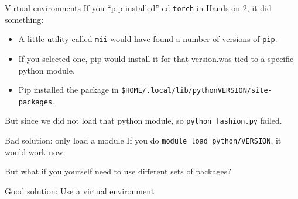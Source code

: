 \documentclass[
  10pt,
  ignorenonframetext,
  aspectratio=169,handout]{beamer}
\newenvironment{Shaded}{\begin{snugshade}}{\end{snugshade}}
\newcommand{\AttributeTok}[1]{\textcolor[rgb]{0.80,0.80,0.80}{#1}}
\newcommand{\ExtensionTok}[1]{\textcolor[rgb]{0.80,0.80,0.80}{#1}}
\newcommand{\KeywordTok}[1]{\textcolor[rgb]{0.94,0.87,0.69}{#1}}
\newcommand{\NormalTok}[1]{\textcolor[rgb]{0.80,0.80,0.80}{#1}}
\newcommand{\VariableTok}[1]{\textcolor[rgb]{0.80,0.80,0.80}{#1}}
\begin{document}
\begin{frame}[fragile]{Virtual environments}
\label{virtual-environments}
If you ``pip installed''-ed \texttt{torch} in Hands-on 2, it did something:

\pause

\begin{itemize}
\item
  A little utility called \texttt{mii} would have found a number of versions of \texttt{pip}.\vspace{-2mm}

  \pause
\item
  If you selected one, pip would install it for that version.was tied to a specific python module.\vspace{-2mm}

  \pause
\item
  Pip installed the package in \texttt{\$HOME/.local/lib/pythonVERSION/site-packages}.
\end{itemize}

But since we did not load that python module, so \texttt{python\ fashion.py} failed.

\begin{block}{Bad solution: only load a module}\setlength{\parskip}{0.5\baselineskip}
\label{bad-solution-only-load-a-module}
If you do \texttt{module\ load\ python/VERSION}, it would work now.

But what if you yourself need to use different sets of packages?
\end{block}

\begin{block}{Good solution: Use a virtual environment}\setlength{\parskip}{0.5\baselineskip}
\label{good-solution-use-a-virtual-environment}
\vspace{-2mm}

\begin{Shaded}
\end{Shaded}
\end{block}
\end{frame}
\end{document}
